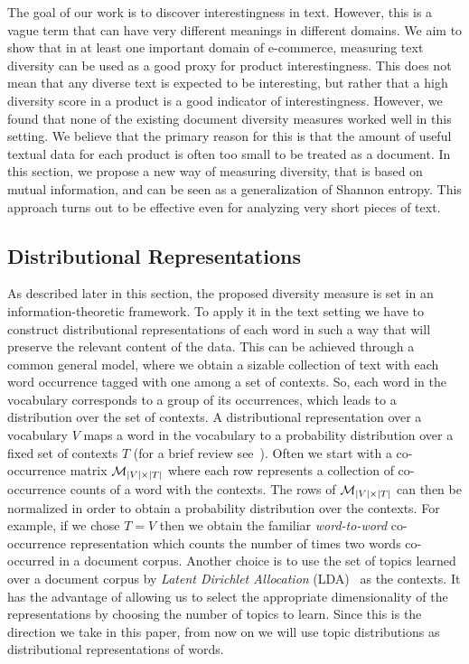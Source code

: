 The goal of our work is to discover interestingness in text. However,
this is a vague term that can have very different meanings in different
domains. We aim to show that in at least one important domain of
e-commerce, measuring text diversity can be used as a good proxy for 
product interestingness. This does not mean that any diverse text is
expected to be interesting, but rather that a high diversity score in
a product is a good indicator of interestingness. However, we found
that none of the existing 
document diversity measures worked well in this setting. We believe
that the primary reason for this is that the amount of useful textual
data for each product is often too small to be treated as a document. 
In this section, we propose a new way of measuring diversity, that is
based on mutual information, and can be seen as a generalization of
Shannon entropy. This approach turns out to be effective even for
analyzing very short pieces of text. 


\subsection{Distributional Representations}
\label{sec:distributional-representations}
As described later in this section, the proposed diversity measure
is set in an information-theoretic framework. 
To apply it in the text setting we have to construct distributional
representations of each word in such a way that will preserve the
relevant content of the data.
This can be achieved through a common general model,
where we obtain a sizable collection of text with each word
occurrence tagged with one among a set of
contexts. 
So, each word in the vocabulary
corresponds to a group of its occurrences, which leads to a
distribution over the set of contexts. A distributional representation
over a vocabulary $V$ maps a word in the vocabulary to a  
probability distribution over a fixed set of contexts $T$  (for a brief review
see~\cite{Turian10wordrepresentations}). Often we start with a
co-occurrence matrix ${\mathcal M}_{|V|\times|T|}$ where each row represents a
collection of co-occurrence counts of a word with the contexts. The
rows of ${\mathcal M}_{|V|\times|T|}$ can then  be normalized in order to
obtain a probability distribution over the contexts.
For example, if we chose $T=V$ then we obtain the familiar {\sl
  word-to-word} co-occurrence representation which counts the number 
of times two words co-occurred in a document corpus. Another choice is
to use the set of topics learned over a document 
corpus by {\sl Latent Dirichlet Allocation}
(LDA)~\cite{Blei:2003:LDA:944919.944937} as the contexts. It has the
advantage of allowing us to select the appropriate dimensionality of
the representations by choosing the number of topics to learn. Since
this is the direction we take in this paper, from now on we will use
topic distributions as distributional representations of words.

